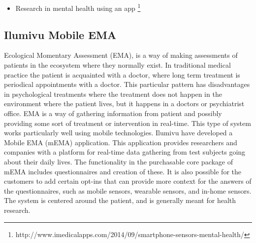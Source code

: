 \begin{itemize}
    \item Research in mental health using an app \footnote{http://www.imedicalapps.com/2014/09/smartphone-sensors-mental-health/}
\end{itemize}

\subsection{Ilumivu Mobile EMA}
\label{sub:ilumivu_mobile_ema}

Ecological Momentary Assessment (EMA), is a way of making assessments of patients in the ecosystem where they normally exist. In traditional medical practice the patient is acquainted with a doctor, where long term treatment is periodical appointments with a doctor. This particular pattern has disadvantages in psychological treatments where the treatment does not happen in the environment where the patient lives, but it happens in a doctors or psychiatrist office. EMA is a way of gathering information from patient and possibly providing some sort of treatment or intervention in real-time. This type of system works particularly well using mobile technologies. Ilumivu have developed a Mobile EMA (mEMA) application. This application provides researchers and companies with a platform for real-time data gathering from test subjects going about their daily lives. The functionality in the purchasable core package of mEMA includes questionnaires and creation of these. It is also possible for the customers to add certain opt-ins that can provide more context for the answers of the questionnaires, such as mobile sensors, wearable sensors, and in-home sensors. The system is centered around the patient, and is generally meant for health research.





